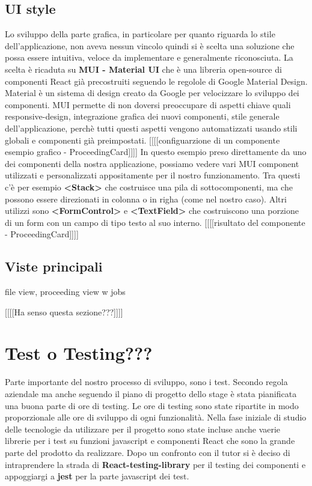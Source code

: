 \subsection{UI style}
Lo sviluppo della parte grafica, in particolare per quanto riguarda lo stile dell'applicazione, non aveva nessun vincolo quindi si è scelta una soluzione che possa essere intuitiva, veloce da implementare e
generalmente riconosciuta. La scelta è ricaduta su \textbf{MUI - Material UI} che è una libreria open-source di componenti React già precostruiti seguendo le regolole di Google Material Design.
Material è un sistema di design creato da Google per velocizzare lo sviluppo dei componenti. MUI permette di non doversi preoccupare di aspetti chiave quali responsive-design, integrazione grafica dei nuovi componenti, stile
generale dell'applicazione, perchè tutti questi aspetti vengono automatizzati usando stili globali e componenti già preimpostati.
  [[[[configuarzione di un componente esempio grafico - ProceedingCard]]]]
In questo esempio preso direttamente da uno dei componenti della nostra applicazione, possiamo vedere vari MUI component utilizzati e personalizzati appositamente per il nostro funzionamento.
Tra questi c'è per esempio \textbf{<Stack>} che costruisce una pila di sottocomponenti, ma che possono essere direzionati in colonna o in righa (come nel nostro caso). Altri utilizzi sono \textbf{<FormControl>} e \textbf{<TextField>} che
costruiscono una porzione di un form con un campo di tipo testo al suo interno.
  [[[[risultato del componente - ProceedingCard]]]]

\subsection{Viste principali}
file view, proceeding view w jobs

  [[[[Ha senso questa sezione???]]]]
\section{Test o Testing???}
Parte importante del nostro processo di sviluppo, sono i test. Secondo regola aziendale ma anche seguendo il piano di progetto dello stage è stata pianificata una buona parte di ore di testing. Le ore di
testing sono state ripartite in modo proporzionale alle ore di sviluppo di ogni funzionalità. Nella fase iniziale di studio delle tecnologie da utilizzare per il progetto sono state incluse anche vaerie librerie per
i test su funzioni javascript e componenti React che sono la grande parte del prodotto da realizzare. Dopo un confronto con il tutor si è deciso di intraprendere la strada di \textbf{React-testing-library} per il testing dei componenti
e appoggiargi a \textbf{jest} per la parte javascript dei test.

